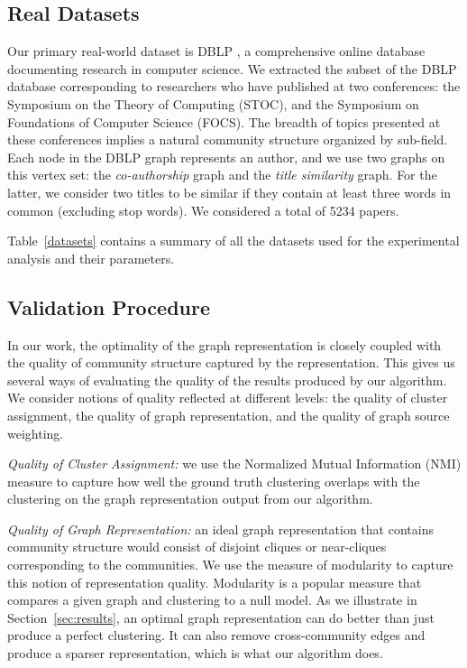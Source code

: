 \documentclass[twoside,twocolumn]{article}
\begin{document}
\subsection{Real Datasets}
Our primary real-world dataset is DBLP \cite{Ley02}, a comprehensive online
database documenting research in computer science. We extracted the subset of
the DBLP database corresponding to researchers who have published at two
conferences: the Symposium on the Theory of Computing (STOC), and the Symposium
on Foundations of Computer Science (FOCS). The breadth of topics presented at
these conferences implies a natural community structure organized by sub-field.
Each node in the DBLP graph represents an author, and we use two graphs on this
vertex set: the {\em co-authorship} graph and the {\em title similarity} graph.
For the latter, we consider two titles to be similar if they contain at least
three words in common (excluding stop words). We considered a total of 5234
papers.

Table~\ref{datasets} contains a summary of all the datasets used for
the experimental analysis and their parameters.


\subsection{Validation Procedure} 
\label{sec:validation}
In our work, the optimality of the graph representation is closely coupled with
the quality of community structure captured by the representation. This gives
us several ways of evaluating the quality of the results produced by our
algorithm. We consider notions of quality reflected at different levels: the
quality of cluster assignment, the quality of graph representation, and the
quality of graph source weighting.

{\em Quality of Cluster Assignment:} we use the Normalized Mutual Information
(NMI) measure \cite{Danon05} to capture how well the ground truth clustering
overlaps with the clustering on the graph representation output from our
algorithm. 

{\em Quality of Graph Representation:} an ideal graph representation that
contains community structure would consist of disjoint cliques or near-cliques
corresponding to the communities. We use the measure of modularity
\cite{Newman06} to capture this notion of representation quality. Modularity is
a popular measure that compares a given graph and clustering to a null
model. 
As we illustrate in Section~\ref{sec:results}, an optimal graph representation can do
better than just produce a perfect clustering. It can also remove
cross-community edges and produce a sparser representation, which is what our
algorithm does.
 
\end{document}
